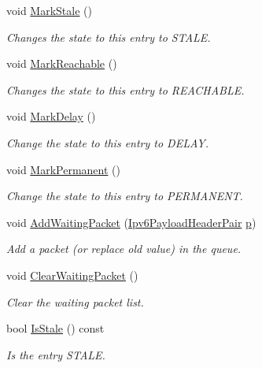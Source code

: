 \begin{DoxyCompactItemize}
void \hyperlink{classns3_1_1NdiscCache_1_1Entry_a595b471e78fc26b8289fa269b3a8b443}{Mark\+Stale} ()
\begin{DoxyCompactList}\small\item\em Changes the state to this entry to S\+T\+A\+LE. \end{DoxyCompactList}\item 
void \hyperlink{classns3_1_1NdiscCache_1_1Entry_a3a89da1b78340a4fd735293fb76d3918}{Mark\+Reachable} ()
\begin{DoxyCompactList}\small\item\em Changes the state to this entry to R\+E\+A\+C\+H\+A\+B\+LE. \end{DoxyCompactList}\item 
void \hyperlink{classns3_1_1NdiscCache_1_1Entry_ac44c21887c70ed21a8b1c2df4548f9b1}{Mark\+Delay} ()
\begin{DoxyCompactList}\small\item\em Change the state to this entry to D\+E\+L\+AY. \end{DoxyCompactList}\item 
void \hyperlink{classns3_1_1NdiscCache_1_1Entry_a0914e9ccdb9513e0f88712a5f63f57e9}{Mark\+Permanent} ()
\begin{DoxyCompactList}\small\item\em Change the state to this entry to P\+E\+R\+M\+A\+N\+E\+NT. \end{DoxyCompactList}\item 
void \hyperlink{classns3_1_1NdiscCache_1_1Entry_ae3ceb95222a17abf23102a2463282bd5}{Add\+Waiting\+Packet} (\hyperlink{classns3_1_1NdiscCache_a29c07f4c9da0e923f442f6440666240e}{Ipv6\+Payload\+Header\+Pair} \hyperlink{lte__link__budget__x2__handover__measures_8m_ac9de518908a968428863f829398a4e62}{p})
\begin{DoxyCompactList}\small\item\em Add a packet (or replace old value) in the queue. \end{DoxyCompactList}\item 
void \hyperlink{classns3_1_1NdiscCache_1_1Entry_a193dd372018c17f093f87b4663454d92}{Clear\+Waiting\+Packet} ()
\begin{DoxyCompactList}\small\item\em Clear the waiting packet list. \end{DoxyCompactList}\item 
bool \hyperlink{classns3_1_1NdiscCache_1_1Entry_af715c9c3e2a5ae43213628aa3acdb711}{Is\+Stale} () const 
\begin{DoxyCompactList}\small\item\em Is the entry S\+T\+A\+LE. \end{DoxyCompactList}\item 

\end{DoxyCompactItemize}
